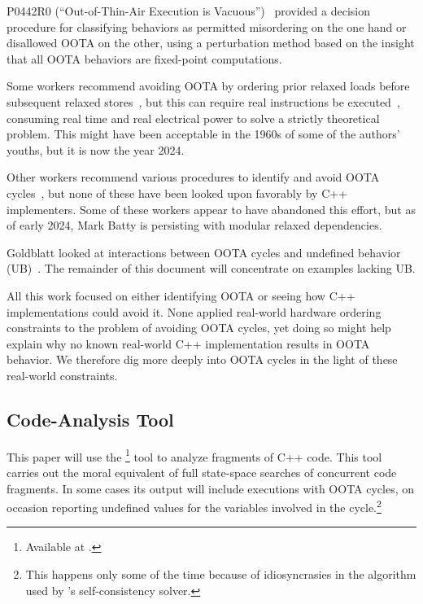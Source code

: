 \documentclass[10]{article}
\begin{document}
P0442R0 (``Out-of-Thin-Air Execution is Vacuous'')~\cite{PaulEMcKenney2016OOTA}
provided a decision procedure for classifying behaviors as permitted
misordering on the one hand or disallowed OOTA on the other, using
a perturbation method based on the insight that all OOTA behaviors are
fixed-point computations.

Some workers recommend avoiding OOTA by ordering prior relaxed
loads before subsequent relaxed
stores~\cite{Boehm:2014:OGA:2618128.2618134,HansBoehm2019OOTArevisitedAgain,Lahav:2017:RSC:3062341.3062352},
but this can require real instructions be
executed~\cite[Section 7.1]{Maranget2012TutorialARMPower},
consuming real time and real electrical power to solve a strictly
theoretical problem.
This might have been acceptable in the 1960s of some of the authors'
youths, but it is now the year 2024.

Other workers recommend various procedures to identify and avoid OOTA
cycles~\cite{Lahav:2017:RSC:3062341.3062352,Sinclair:2017:CAR:3079856.3080206,Lee:10.1145/3385412.3386010,MarkBatty2019ModularRelaxedDependenciesOOTA},
but none of these have been looked upon favorably by C++ implementers.
Some of these workers appear to have abandoned this effort, but as of
early 2024, Mark Batty is persisting with modular relaxed dependencies.

Goldblatt looked at interactions between OOTA cycles and
undefined behavior (UB)~\cite{DavidGoldblatt2019NoElegantOOTAfix}.
The remainder of this document will concentrate on examples lacking UB.

All this work focused on either identifying OOTA or seeing how C++
implementations could avoid it.
None applied real-world hardware ordering constraints to the problem
of avoiding OOTA cycles,
yet doing so might help explain why no known real-world C++ implementation
results in OOTA behavior.
We therefore dig more deeply into OOTA cycles in the light
of these real-world constraints.

\subsection{Code-Analysis Tool}
\label{sec:Code-Analysis Tool}

This paper will use the \footnote{
	Available at .}
tool to analyze fragments of C++ code.
This tool carries out the moral equivalent of full state-space searches
of concurrent code fragments.
In some cases its output will include executions with OOTA cycles,
on occasion reporting undefined values for the variables involved in
the cycle.\footnote{
	This happens only some of the time because of idiosyncrasies
	in the algorithm used by 's self-consistency solver.}
\end{document}
